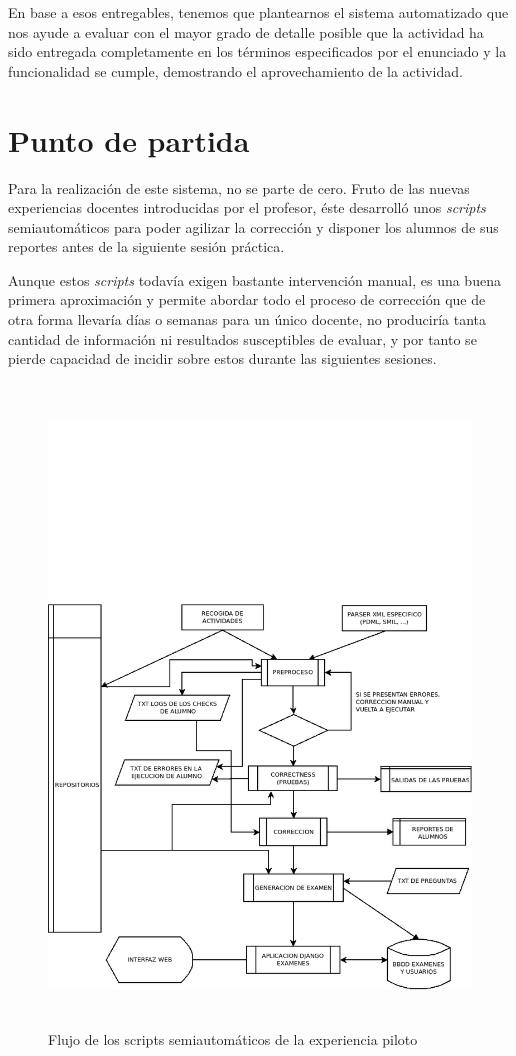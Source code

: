 En base a esos entregables, tenemos que plantearnos el sistema automatizado que nos ayude a evaluar con el mayor grado de detalle posible que la actividad ha sido entregada completamente en los términos especificados por el enunciado y la funcionalidad se cumple, demostrando el aprovechamiento de la actividad.



\section{Punto de partida}
\label{sec:puntp_partida}


Para la realización de este sistema, no se parte de cero. Fruto de las nuevas experiencias docentes introducidas por el profesor, éste desarrolló unos \textit{scripts} semiautomáticos para poder agilizar la corrección y disponer los alumnos de sus reportes antes de la siguiente sesión práctica.


Aunque estos \textit{scripts} todavía exigen bastante intervención manual, es una buena primera aproximación y permite abordar todo el proceso de corrección que de otra forma llevaría días o semanas para un único docente, no produciría tanta cantidad de información ni resultados susceptibles de evaluar, y por tanto se pierde capacidad de incidir sobre estos durante las siguientes sesiones.

\begin{figure}[H]
   \centering
   \includegraphics[height=17cm]{img/Diagram1_flujo_semiautomatico}
   \caption{Flujo de los scripts semiautomáticos de la experiencia piloto}
   \label{figura:flujo_semiautomatico}
\end{figure}


